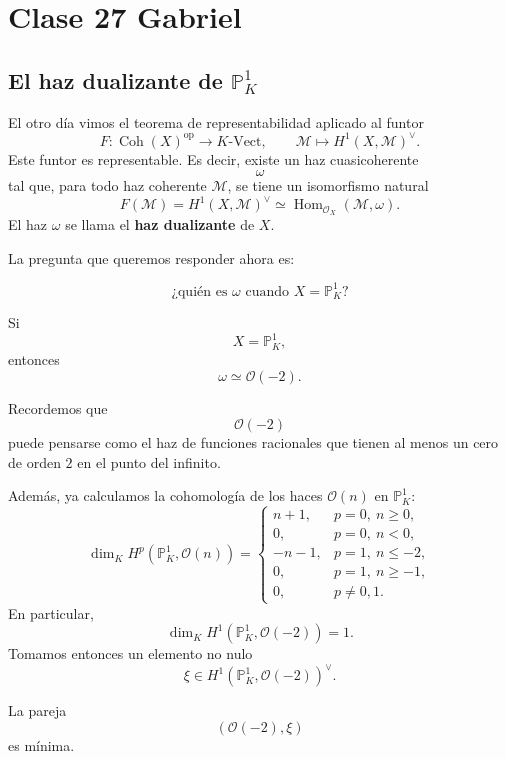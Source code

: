 \section{Clase 27 Gabriel}

\subsection*{El haz dualizante de $\mathbb{P}^1_K$}

El otro día vimos el teorema de representabilidad aplicado al funtor
\[
F:\operatorname{Coh}(X)^{\operatorname{op}}\longrightarrow K\text{-Vect},
\qquad
\mathcal{M}\longmapsto H^1(X,\mathcal{M})^\vee.
\]
Este funtor es representable. Es decir, existe un haz cuasicoherente
\[
\omega
\]
tal que, para todo haz coherente $\mathcal{M}$, se tiene un isomorfismo natural
\[
F(\mathcal{M}) = H^1(X,\mathcal{M})^\vee
\simeq
\operatorname{Hom}_{\mathcal{O}_X}(\mathcal{M},\omega).
\]
El haz $\omega$ se llama el \textbf{haz dualizante} de $X$.

La pregunta que queremos responder ahora es:

\[
\text{¿quién es } \omega \text{ cuando } X=\mathbb{P}^1_K\text{?}
\]

\begin{theorem}
Si
\[
X=\mathbb{P}^1_K,
\]
entonces
\[
\omega\simeq \mathcal{O}(-2).
\]
\end{theorem}

Recordemos que
\[
\mathcal{O}(-2)
\]
puede pensarse como el haz de funciones racionales que tienen al menos un cero de orden $2$ en el punto del infinito.

Además, ya calculamos la cohomología de los haces $\mathcal{O}(n)$ en $\mathbb{P}^1_K$:
\[
\dim_K H^p(\mathbb{P}^1_K,\mathcal{O}(n))=
\begin{cases}
n+1, & p=0,\ n\ge 0,\\
0, & p=0,\ n<0,\\
-n-1, & p=1,\ n\le -2,\\
0, & p=1,\ n\ge -1,\\
0, & p\neq 0,1.
\end{cases}
\]
En particular,
\[
\dim_K H^1(\mathbb{P}^1_K,\mathcal{O}(-2))=1.
\]
Tomamos entonces un elemento no nulo
\[
\xi\in H^1(\mathbb{P}^1_K,\mathcal{O}(-2))^\vee.
\]

\begin{lemma}
La pareja
\[
(\mathcal{O}(-2),\xi)
\]
es mínima.
\end{lemma}

